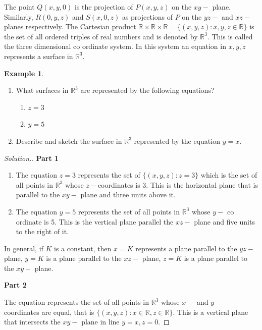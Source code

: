 \documentclass[11pt,a4paper]{article}
\theoremstyle{definition}
\newtheorem{exa}[thm]{Example}
\newenvironment{solution}
  {\renewcommand{\qedsymbol}{}\begin{proof}[\textit{Solution}.]}
  {\end{proof}}
\newcommand{\subhead}[1]{%
  \par\medskip\noindent\textbf{#1}\par\nobreak\smallskip}
\begin{document}
The point $Q(x,y,0)$ is the projection of $P(x,y,z)$ on the $xy - $ plane. Similarly, $R(0,y,z)$ and $S(x,0,z)$ as projections of $P$ on the $yz - $ and $xz - $ planes respectively. The Cartesian product $\mathbb{R}\times \mathbb{R}\times \mathbb{R} = \{(x,y,z): x,y,z \in \mathbb{R}\}$ is the set of all ordered triples of real numbers and is denoted by $\mathbb{R}^3$. This is called the three dimensional co ordinate system. In this system an equation in $x,y,z$ represents a surface in $\mathbb{R}^3$.


\begin{exa}
\begin{enumerate}
\item What surfaces in $\mathbb{R}^3$ are represented by the following equations?
\begin{enumerate}
      \item $ z = 3$
      \item $ y = 5$
\end{enumerate}
\item Describe and sketch the surface in $\mathbb{R}^3$ represented by the equation $y = x$.
\end{enumerate}
\end{exa}

\begin{solution}
\subhead{Part 1}
\begin{enumerate}
       \item The equation $z = 3$ represents the set of $\{(x,y,z): z = 3\}$ which is the set of all points in $\mathbb{R}^3$ whose $z- $coordinates is 3. This is the horizontal plane that is parallel to the $xy - $ plane and three units above it.
       \item The equation $y = 5$ represents the set of all points in $\mathbb{R}^3$ whose $y - $ co ordinate is 5. This is the vertical plane parallel the $xz - $ plane and five units to the right of it.
\end{enumerate}

In general, if $K$ is a constant, then $x = K$ represents a plane parallel to the $yz - $ plane, $y = K$ is a plane parallel to the $xz - $ plane, $z = K$ is a plane parallel to the $xy - $ plane.

\subhead{Part 2}
The equation represents the set of all points in $\mathbb{R}^3$ whose $x - $ and $y - $ coordinates are equal, that is $\{(x,y,z): x \in \mathbb{R}, z\in \mathbb{R}\}$. This is a vertical plane that intersects the $xy - $ plane in line $y = x , z  = 0$.
\end{solution}
\end{document}
